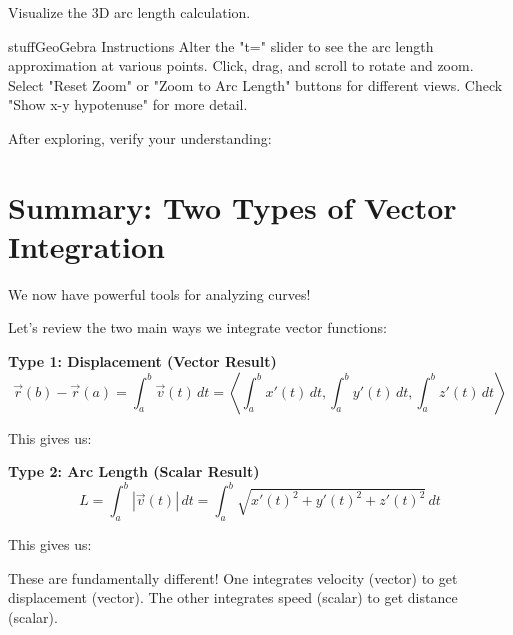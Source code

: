 \documentclass{ximera}
\begin{document}
\begin{problem}
Visualize the 3D arc length calculation.

\begin{expandable}{stuff}{GeoGebra Instructions}
    Alter the "t=" slider to see the arc length approximation at various points. Click, drag, and scroll to rotate and zoom. Select "Reset Zoom" or "Zoom to Arc Length" buttons for different views. Check "Show x-y hypotenuse" for more detail.
\end{expandable}

\begin{center}
\end{center}

After exploring, verify your understanding:
\begin{selectAll}
\end{selectAll}
\end{problem}

\section*{Summary: Two Types of Vector Integration}

We now have powerful tools for analyzing curves!

\begin{problem}
Let's review the two main ways we integrate vector functions:

\textbf{Type 1: Displacement (Vector Result)}
$$\vec{r}(b)-\vec{r}(a)= \int_a^b \vec{v}(t)\, dt=\left\langle \int_a^b x'(t)\, dt, \int_a^b y'(t)\, dt, \int_a^b z'(t)\, dt\right\rangle$$

This gives us:
\begin{multipleChoice}
\end{multipleChoice}

\textbf{Type 2: Arc Length (Scalar Result)}
$$L = \int_a^b |\vec{v}(t)|\, dt=\int_a^b\sqrt{x'(t)^2+y'(t)^2+z'(t)^2}\, dt$$

This gives us:
\begin{multipleChoice}
\end{multipleChoice}

\begin{feedback}
These are fundamentally different! One integrates velocity (vector) to get displacement (vector). The other integrates speed (scalar) to get distance (scalar).
\end{feedback}
\end{problem}
\end{document}
